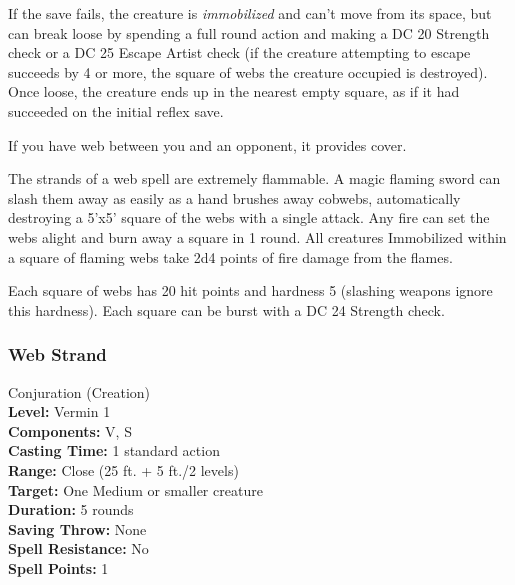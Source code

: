 If the save fails, the creature is \emph{immobilized} and can't move from its space,  
but can break loose by spending a full round action and making a DC 20 Strength check or a DC 25 Escape Artist check 
(if the creature attempting to escape succeeds by 4 or more, the square of webs the creature occupied is destroyed).
Once loose, the creature ends up in the nearest empty square, as if it had succeeded on the initial reflex save.

If you have web between you and an opponent, it provides cover.

The strands of a web spell are extremely flammable. 
A magic flaming sword can slash them away as easily as a hand brushes away cobwebs, automatically destroying a 
5'x5' square of the webs with a single attack.
Any fire can set the webs alight and burn away a square in 1 round. 
All creatures Immobilized within a square of flaming webs take 2d4 points of fire damage from the flames.

Each square of webs has 20 hit points and hardness 5 (slashing weapons ignore this hardness).
Each square can be burst with a DC 24 Strength check.



\subsubsection{Web Strand}
\label{Spell:WebStrand}
Conjuration (Creation)
\\ \textbf{Level:} Vermin 1
\\ \textbf{Components:} V, S
\\ \textbf{Casting Time:} 1 standard action
\\ \textbf{Range:} Close (25 ft. + 5 ft./2 levels)
\\ \textbf{Target:} One Medium or smaller creature
\\ \textbf{Duration:} 5 rounds
\\ \textbf{Saving Throw:} None
\\ \textbf{Spell Resistance:} No
\\ \textbf{Spell Points:} 1

